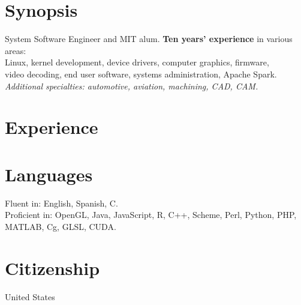 \documentclass[line,margin]{res}
\begin{document}
\thispagestyle{empty}

\address{1201 West Park Street, Cedar Park, TX 78613-2801}
\address{ \href{mailto:jsoltren@alum.mit.edu}{jsoltren@alum.mit.edu}
   +1 (347) 503-9558
   \url{https://www.linkedin.com/in/jsoltren}}

\begin{resume}

\section{Synopsis}
System Software Engineer and MIT alum. \textbf{Ten years’ experience}
in various areas:\\
Linux, kernel development, device drivers, computer graphics, firmware,\\
video decoding, end user software, systems administration, Apache Spark.\\
\emph{Additional specialties: automotive, aviation, machining, CAD, CAM.}



\section{Experience}




%



%







\section{Languages}
Fluent in: English, Spanish, C.\\
Proficient in: OpenGL, Java, JavaScript, R, C++, Scheme, Perl, Python, PHP,\\
\mbox{MATLAB}, Cg, GLSL, CUDA.

\section{Citizenship}
United States

\end{resume}
\end{document}

